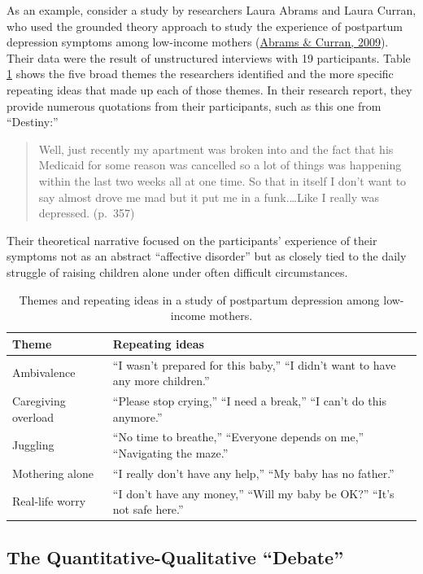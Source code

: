 \documentclass[
]{krantz}
\begin{document}
As an example, consider a study by researchers Laura Abrams and Laura Curran, who used the grounded theory approach to study the experience of postpartum depression symptoms among low-income mothers (\protect\hyperlink{ref-abrams2009and}{Abrams \& Curran, 2009}). Their data were the result of unstructured interviews with 19 participants. Table \ref{tab:themes} shows the five broad themes the researchers identified and the more specific repeating ideas that made up each of those themes. In their research report, they provide numerous quotations from their participants, such as this one from ``Destiny:''

\begin{quote}
Well, just recently my apartment was broken into and the fact that his Medicaid for some reason was cancelled so a lot of things was happening within the last two weeks all at one time. So that in itself I don't want to say almost drove me mad but it put me in a funk.\ldots Like I really was depressed. (p.~357)
\end{quote}

Their theoretical narrative focused on the participants' experience of their symptoms not as an abstract ``affective disorder'' but as closely tied to the daily struggle of raising children alone under often difficult circumstances.

\begin{table}

\caption{\label{tab:themes}Themes and repeating ideas in a study of postpartum depression among low-income mothers.}
\centering
\begin{tabular}[t]{l|l}
\hline
Theme & Repeating ideas\\
\hline
Ambivalence & “I wasn’t prepared for this baby,” “I didn’t want to have any more children.”\\
\hline
Caregiving overload & “Please stop crying,” “I need a break,” “I can’t do this anymore.”\\
\hline
Juggling & “No time to breathe,” “Everyone depends on me,” “Navigating the maze.”\\
\hline
Mothering alone & “I really don’t have any help,” “My baby has no father.”\\
\hline
Real-life worry & “I don’t have any money,” “Will my baby be OK?” “It’s not safe here.”\\
\hline
\end{tabular}
\end{table}

\hypertarget{the-quantitative-qualitative-debate}{%
\subsection*{The Quantitative-Qualitative ``Debate''}\label{the-quantitative-qualitative-debate}}
\end{document}
